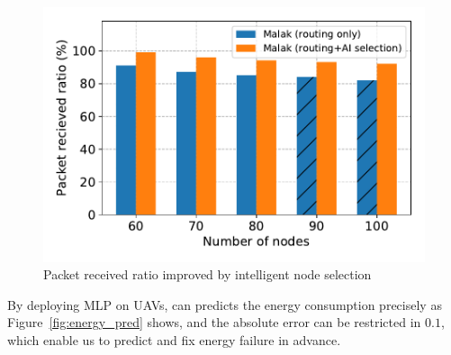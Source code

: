 \begin{figure}[!h]
	\centering
	\includegraphics[width=.95\columnwidth]{Figure/ai_selection}
	\vspace{-0.1in}
	\caption{Packet received ratio improved by intelligent node selection
		\textnormal{
		}}
	\label{fig:ai_selection}
\end{figure}

By deploying MLP on UAVs, {\sdn} can predicts the energy consumption precisely as
Figure~\ref{fig:energy_pred} shows, and the absolute error can be restricted in
$0.1$, which enable us to predict and fix energy failure in advance.

